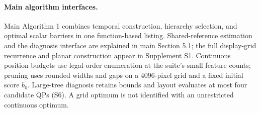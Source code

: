 \paragraph{Main algorithm interfaces.}
Main Algorithm 1 combines temporal construction, hierarchy selection, and optimal scalar barriers in one function-based listing. Shared-reference estimation and the diagnosis interface are explained in main Section 5.1; the full display-grid recurrence and planar construction appear in Supplement S1. Continuous position budgets use legal-order enumeration at the suite's small feature counts; pruning uses rounded widths and gaps on a 4096-pixel grid and a fixed initial score $b_0$. Large-tree diagnosis retains bounds and layout evaluates at most four candidate QPs (S6). A grid optimum is not identified with an unrestricted continuous optimum.
